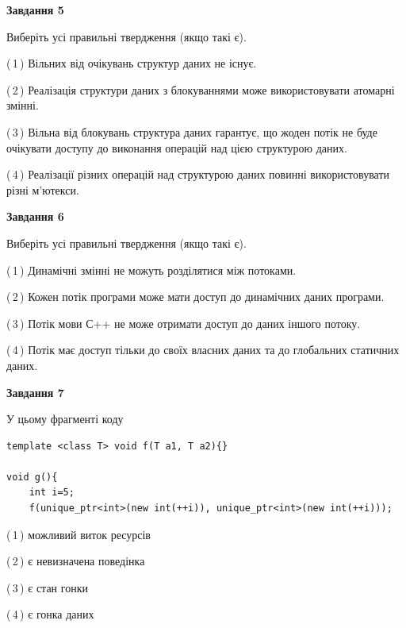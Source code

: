 \documentclass[12pt, ukrainian]{article}
\begin{document}
\begin {large}
{\begin{center}
\textbf{Завдання 5}
\end{center}

Виберіть усі правильні твердження (якщо такі є).\par
\vspace{2mm}

(\,1\,) Вільних від очікувань структур даних не існує.%

(\,2\,) Реалізація структури даних з блокуваннями може використовувати атомарні змінні.%

(\,3\,) Вільна від блокувань структура даних гарантує, що жоден потік не буде очікувати доступу до виконання операцій над цією структурою даних.%

(\,4\,) Реалізації різних операцій над структурою даних повинні використовувати різні м’ютекси.%
\newpage


\begin{center}
\textbf{Завдання 6}
\end{center}

Виберіть усі правильні твердження (якщо такі є).\par
\vspace{2mm}

(\,1\,) Динамічні змінні не можуть розділятися між потоками.%

(\,2\,) Кожен потік програми може мати доступ до динамічних даних програми.%

(\,3\,) Потік мови С++ не може отримати доступ до даних іншого потоку.%

(\,4\,) Потік має доступ тільки до своїх власних даних та до глобальних статичних даних.%


\begin{center}
\textbf{Завдання 7}
\end{center}

У цьому фрагменті коду
\begin{verbatim}
template <class T> void f(T a1, T a2){}

void g(){
    int i=5;
    f(unique_ptr<int>(new int(++i)), unique_ptr<int>(new int(++i)));
\end{verbatim}

(\,1\,) можливий виток ресурсів%

(\,2\,) є невизначена поведінка%

(\,3\,) є стан гонки%

(\,4\,) є гонка даних%

}
\end {large}

\vspace{4mm}
\newpage
\end{document}
